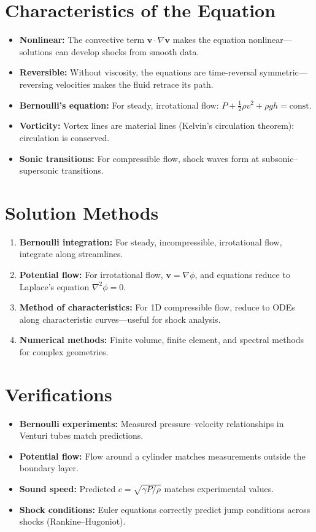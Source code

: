 \section*{Characteristics of the Equation}

\begin{itemize}
\item \textbf{Nonlinear:} The convective term $\mathbf{v} \cdot \nabla \mathbf{v}$ makes the equation nonlinear---solutions can develop shocks from smooth data.
\item \textbf{Reversible:} Without viscosity, the equations are time-reversal symmetric---reversing velocities makes the fluid retrace its path.
\item \textbf{Bernoulli's equation:} For steady, irrotational flow: $P + \frac{1}{2}\rho v^2 + \rho gh = \text{const}$.
\item \textbf{Vorticity:} Vortex lines are material lines (Kelvin's circulation theorem): circulation is conserved.
\item \textbf{Sonic transitions:} For compressible flow, shock waves form at subsonic--supersonic transitions.
\end{itemize}
\section*{Solution Methods}

\begin{enumerate}
\item \textbf{Bernoulli integration:} For steady, incompressible, irrotational flow, integrate along streamlines.
\item \textbf{Potential flow:} For irrotational flow, $\mathbf{v} = \nabla\phi$, and equations reduce to Laplace's equation $\nabla^2 \phi = 0$.
\item \textbf{Method of characteristics:} For 1D compressible flow, reduce to ODEs along characteristic curves---useful for shock analysis.
\item \textbf{Numerical methods:} Finite volume, finite element, and spectral methods for complex geometries.
\end{enumerate}
\section*{Verifications}

\begin{itemize}
\item \textbf{Bernoulli experiments:} Measured pressure--velocity relationships in Venturi tubes match predictions.
\item \textbf{Potential flow:} Flow around a cylinder matches measurements outside the boundary layer.
\item \textbf{Sound speed:} Predicted $c = \sqrt{\gamma P / \rho}$ matches experimental values.
\item \textbf{Shock conditions:} Euler equations correctly predict jump conditions across shocks (Rankine--Hugoniot).
\end{itemize}
